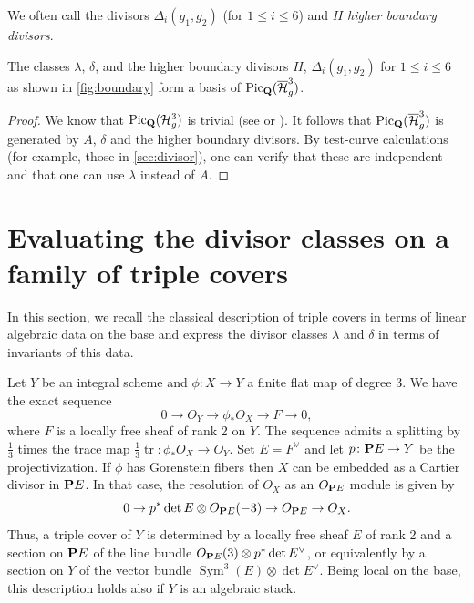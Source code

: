 \documentclass{amsart}
\newcommand {\Q}{{\bf Q}}
\renewcommand {\P}{{\bf P}}
\newcommand {\from}{{\colon}}
\newcommand{\orb}[1]{{\mathcal #1}}     %
\renewcommand {\o}[1]{\overline{#1}}
\newcommand{\dual}[1]{#1^{\vee}}
\DeclareMathOperator{\Sym}{Sym}
\DeclareMathOperator{\tr}{tr}
\DeclareMathOperator{\Pic}{Pic}
\renewcommand{\o}{\overline}
\begin{document}
We often call the divisors $\Delta_i(g_1,g_2)$ (for $1 \leq i \leq 6$) and $H$ \emph{higher boundary divisors}. 
\begin{proposition}
  The classes $\lambda$, $\delta$, and the higher boundary divisors $H$, $\Delta_i(g_1, g_2)$ for $1 \leq i \leq 6$ as shown in \autoref{fig:boundary} form a basis of $\Pic_\Q(\o{\orb H}_g^3)$.
\end{proposition}
\begin{proof}
  We know that $\Pic_\Q({\orb H}^3_g)$ is trivial (see \citep{Bolognesi09:_Stack_Of_Trigon_Curves} or \citep{Stankova-Frenkel00:_Modul_Of_Trigon_Curves}). It follows that $\Pic_\Q(\o{\orb H}_g^3)$ is generated by $A$, $\delta$ and the higher boundary divisors. By test-curve calculations (for example, those in \autoref{sec:divisor}), one can verify that these are independent and that one can use $\lambda$ instead of $A$.
\end{proof}
\section{Evaluating the divisor classes on a family of triple covers}\label{sec:formulas}
In this section, we recall the classical description of triple covers in terms of linear algebraic data on the base and express the divisor classes $\lambda$ and $\delta$ in terms of invariants of this data.

Let $Y$ be an integral scheme and $\phi \from X \to Y$ a finite flat map of degree 3. We have the exact sequence
\[ 0 \to O_Y \to \phi_* O_X \to F \to 0,\]
where $F$ is a locally free sheaf of rank 2 on $Y$. The sequence admits a splitting by $\frac13$ times the trace map $\frac13\tr \from \phi_* O_X \to O_Y$. Set $E = \dual{F}$ and let $p \from \P E \to Y$ be the projectivization. If $\phi$ has Gorenstein fibers then $X$ can be embedded as a Cartier divisor in $\P E$.  In that case, the resolution of $O_X$ as an $O_{\P E}$ module is given by
\[ 0 \to p^* \det E \otimes O_{\P E}(-3) \to O_{\P E} \to O_X .\]
Thus, a triple cover of $Y$ is determined by a locally free sheaf $E$ of rank 2 and a section on $\P E$ of the line bundle $O_{\P E}(3) \otimes p^* \det \dual{E}$, or equivalently by a section on $Y$ of the vector bundle $\Sym^3(E) \otimes \det \dual{E}$. Being local on the base, this description holds also if $Y$ is an algebraic stack.
\end{document}
